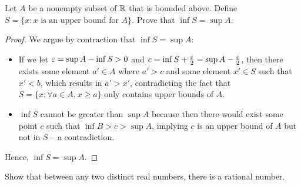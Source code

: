 \begin{problem}\label{prob:inf-of-upper-bounds-is-sup}
  Let $A$ be a nonempty subset of $\mathbb{R}$ that is bounded above. Define 
  $S = \{ x : x \text{ is an upper bound for } A \}$. Prove that $\inf S = \sup A$.
\end{problem}

\begin{proof}
  We argue by contraction that $\inf S = \sup A$:
  \begin{itemize}
    \item If we let $\varepsilon = \sup A - \inf S > 0$ and $c = \inf S +
      \frac{\varepsilon}{2} = \sup A - \frac{\varepsilon}{2}$, then there exists some
      element $a' \in A$ where $a' > c$ and some element $x' \in S$ such that $x' < b$, which
      results in $a' > x'$, contradicting the fact that $S = \{ x : \forall a \in A.\ x \geq a \}$ 
      only contains upper bounds of $A$.
    \item $\inf S$ cannot be greater than $\sup A$ because then there would
      exist some point $c$ such that $\inf B > c > \sup A$, implying $c$ is an upper bound of $A$ 
      but not in $S$ -- a contradiction.
  \end{itemize}
  Hence, $\inf S = \sup A$.
\end{proof}

\begin{problem}\label{prob:density-rationals-in-reals}
  Show that between any two distinct real numbers, there is a rational number.
\end{problem}

